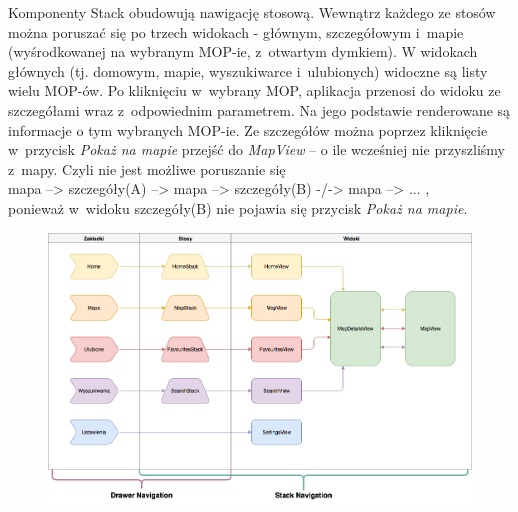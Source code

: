 Komponenty Stack obudowują nawigację stosową. Wewnątrz każdego ze stosów można poruszać się po trzech widokach - głównym, szczegółowym i~mapie (wyśrodkowanej na wybranym MOP-ie, z~otwartym dymkiem). W widokach głównych (tj. domowym, mapie, wyszukiwarce i~ulubionych) widoczne są listy wielu MOP-ów. Po kliknięciu w~wybrany MOP, aplikacja przenosi do widoku ze szczegółami wraz z~odpowiednim parametrem. Na jego podstawie renderowane są informacje o tym wybranych MOP-ie. Ze szczegółów można poprzez kliknięcie w~przycisk \textit{Pokaż na mapie} przejść do \textit{MapView} -- o ile wcześniej nie przyszliśmy z~mapy. \newline Czyli nie jest możliwe poruszanie się\\	\indent mapa --> szczegóły(A) --> mapa --> szczegóły(B) -/-> mapa --> ... ,\\ponieważ w~widoku szczegóły(B) nie pojawia się przycisk \textit{Pokaż na mapie}.


\begin{figure}[!htb]
\includegraphics[width=\textwidth]{images/mopsik_mobile_navigation.png} 
\label{mopsiknav}
\end{figure}

